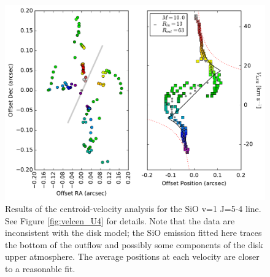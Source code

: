 \documentclass[twocolumn]{aastex61}
\begin{document}
\begin{figure}[!htp]
\includegraphics[scale=1,width=6in]{figures/SiOv=1_5-4_pp_pv_plots_fittedmodel_withavgs.pdf}
\caption{Results of the centroid-velocity analysis for the SiO v=1 J=5-4 line.
See Figure \ref{fig:velcen_U4} for details.
Note that the data are inconsistent with the disk model;
the SiO emission fitted here traces the bottom of the outflow
and possibly some components of the disk upper atmosphere.
The average positions at each velocity are closer to a reasonable fit.
}
\label{fig:velcen_sio}
\end{figure}
\end{document}
